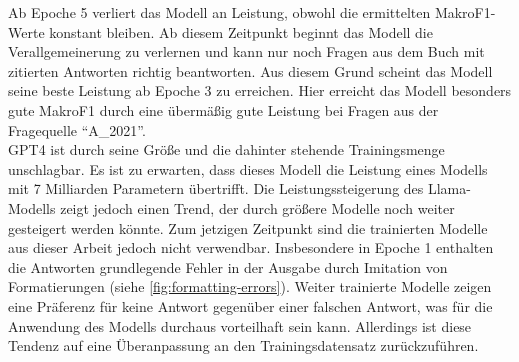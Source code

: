 Ab Epoche 5 verliert das Modell an Leistung, obwohl die ermittelten MakroF1-Werte konstant bleiben.
Ab diesem Zeitpunkt beginnt das Modell die Verallgemeinerung zu verlernen und kann nur noch Fragen aus dem Buch mit zitierten Antworten richtig beantworten.
Aus diesem Grund scheint das Modell seine beste Leistung ab Epoche 3 zu erreichen.
Hier erreicht das Modell besonders gute MakroF1
durch eine übermäßig gute Leistung bei Fragen aus der Fragequelle \enquote{A\_2021}.\\

GPT4 ist durch seine Größe und die dahinter stehende Trainingsmenge unschlagbar.
Es ist zu erwarten, dass dieses Modell die Leistung eines Modells mit 7 Milliarden Parametern übertrifft.
Die Leistungssteigerung des Llama-Modells zeigt jedoch einen Trend, der durch größere Modelle noch weiter gesteigert werden könnte.
Zum jetzigen Zeitpunkt sind die trainierten Modelle aus dieser Arbeit jedoch nicht verwendbar.
Insbesondere in Epoche 1 enthalten die Antworten grundlegende Fehler in der Ausgabe durch Imitation von Formatierungen (siehe \cref{fig:formatting-errors}).
Weiter trainierte Modelle zeigen eine Präferenz für keine Antwort gegenüber einer falschen Antwort,
was für die Anwendung des Modells durchaus vorteilhaft sein kann.
Allerdings ist diese Tendenz auf eine Überanpassung an den Trainingsdatensatz zurückzuführen.\\

